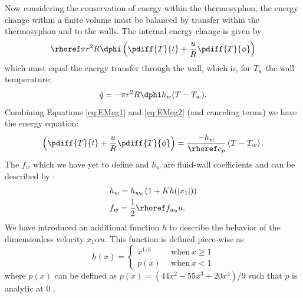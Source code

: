 Now considering the conservation of energy within the thermosyphon, the energy change within a finite volume must be balanced by transfer within the thermosyphon and to the walls.
The internal energy change is given by
\begin{equation} \rhoref \pi r^2 R \dphi \left ( \pdiff{T}{t} + \frac{u}{R}\pdiff{T}{\phi} \right ) \label{eq:EMeg1}\end{equation}
which must equal the energy transfer through the wall, which is, for $T_w$ the wall temperature:
\begin{equation} \dot{q} = -\pi r^2 R \dphi h_w (T - T_w) . \label{eq:EMeg2} \end{equation}
Combining Equations \ref{eq:EMeg1} and \ref{eq:EMeg2} (and canceling terms) we have the energy equation:
\begin{equation} \left ( \pdiff{T}{t} + \frac{u}{R}\pdiff{T}{\phi} \right ) = \frac{-h_w}{\rhoref c_p} \left( T - T_w \right ) \label{eq:EMeq}.\end{equation}
The $f_w$ which we have yet to define and $h_w$ are fluid-wall coefficients and can be described by \cite{ehrhard1990dynamical}:
\begin{align*} & h_w = h_{w_0} \left ( 1 + K h(|x_1|) \right ) \\
& f_w = \frac{1}{2} \rhoref f_{w_0} u .\end{align*}
We have introduced an additional function $h$ to describe the behavior of the dimensionless velocity $x_1 \alpha u$.
This function is defined piece-wise as 
\begin{equation} h (x) = \left \{ \begin{array}{ll} x^{1/3} & ~~\text{when} ~x \geq 1\\ p (x) & ~~\text{when} ~ x <1 \end{array} \right. \label{eq:h_defined} \end{equation} 
where $p(x)$ can be defined as $p(x) = \left( 44x^2 -55 x^3 + 20x^4 \right ) /9$ such that $p$ is analytic at 0 \cite{harris2011predicting}.

